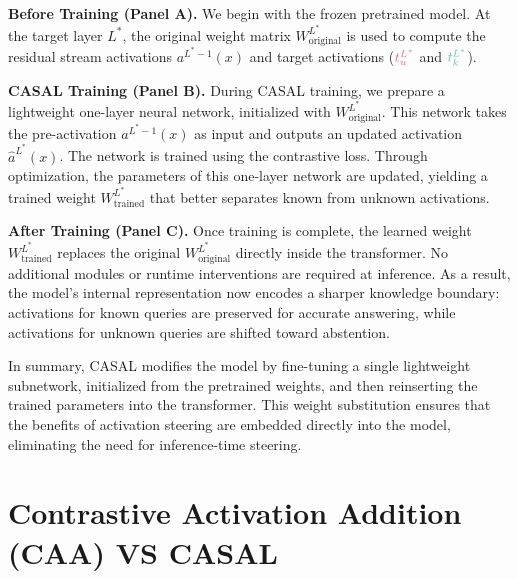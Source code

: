 \documentclass{article} %
\newcommand{\known}[1]{\textcolor{KnownGreen}{#1}}
\newcommand{\unknown}[1]{\textcolor{UnknownRed}{#1}}
\begin{document}
\textbf{Before Training (Panel A).}  
We begin with the frozen pretrained model. At the target layer $L^*$, the original weight matrix $W^{L^*}_{\text{original}}$ is used to compute the residual stream activations $a^{L^{*}-1}(x)$ and target activations ($\unknown{t^{L^*}_u}$ and $\known{t^{L^*}_k}$). 

\textbf{CASAL Training (Panel B).}  
During CASAL training, we prepare a lightweight one-layer neural network, initialized with $W^{L^*}_{\text{original}}$. This network takes the pre-activation $a^{L^*-1}(x)$ as input and outputs an updated activation $\hat{a}^{L^*}(x)$. The network is trained using the contrastive loss. Through optimization, the parameters of this one-layer network are updated, yielding a trained weight $W^{L^*}_{\text{trained}}$ that better separates \known{known} from \unknown{unknown} activations.  

\textbf{After Training (Panel C).}  
Once training is complete, the learned weight $W^{L^*}_{\text{trained}}$ replaces the original $W^{L^*}_{\text{original}}$ directly inside the transformer. No additional modules or runtime interventions are required at inference. As a result, the model’s internal representation now encodes a sharper knowledge boundary: activations for \known{known} queries are preserved for accurate answering, while activations for \unknown{unknown} queries are shifted toward abstention.  

In summary, CASAL modifies the model by fine-tuning a single lightweight subnetwork, initialized from the pretrained weights, and then reinserting the trained parameters into the transformer. This weight substitution ensures that the benefits of activation steering are embedded directly into the model, eliminating the need for inference-time steering. 



\newpage
\section{Contrastive Activation Addition (CAA) VS CASAL}
\label{app:caa_casal}
\end{document}
